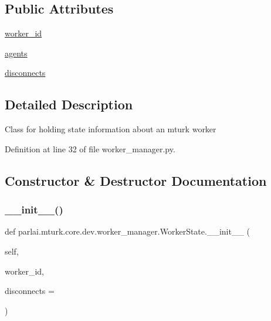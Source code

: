 \subsection*{Public Attributes}
\begin{DoxyCompactItemize}
\item 
\hyperlink{classparlai_1_1mturk_1_1core_1_1dev_1_1worker__manager_1_1WorkerState_aa4019a351d1a1e41bc7a8c26229b2772}{worker\+\_\+id}
\item 
\hyperlink{classparlai_1_1mturk_1_1core_1_1dev_1_1worker__manager_1_1WorkerState_ae267b0c320d73f92f96dd347bb9265cb}{agents}
\item 
\hyperlink{classparlai_1_1mturk_1_1core_1_1dev_1_1worker__manager_1_1WorkerState_aaf0e1e68c219df754da29d8188150796}{disconnects}
\end{DoxyCompactItemize}


\subsection{Detailed Description}
\begin{DoxyVerb}Class for holding state information about an mturk worker\end{DoxyVerb}
 

Definition at line 32 of file worker\+\_\+manager.\+py.



\subsection{Constructor \& Destructor Documentation}
\mbox{\label{classparlai_1_1mturk_1_1core_1_1dev_1_1worker__manager_1_1WorkerState_ad5b7c2eef6d44cb5856beb7f951bc76a}} 
\subsubsection{\texorpdfstring{\+\_\+\+\_\+init\+\_\+\+\_\+()}{\_\_init\_\_()}}
{\footnotesize\ttfamily def parlai.\+mturk.\+core.\+dev.\+worker\+\_\+manager.\+Worker\+State.\+\_\+\+\_\+init\+\_\+\+\_\+ (\begin{DoxyParamCaption}\item[{}]{self,  }\item[{}]{worker\+\_\+id,  }\item[{}]{disconnects = {} }\end{DoxyParamCaption})}

